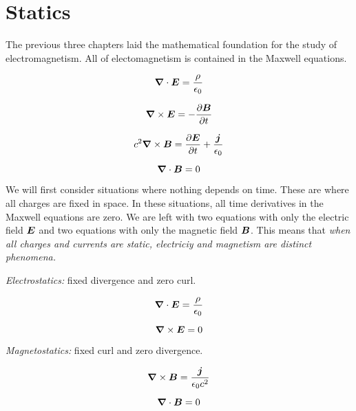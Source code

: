 \section{Statics}

The previous three chapters laid the mathematical foundation
for the study of electromagnetism.
All of electomagnetism is contained in the Maxwell equations.

\begin{equation}
  \boldsymbol{\nabla} \cdot \boldsymbol{E} = \frac{\rho}{\epsilon_0}
\end{equation}

\begin{equation}
  \boldsymbol{\nabla} \times \boldsymbol{E} = - \frac{\partial \boldsymbol{B}}{\partial t}
\end{equation}

\begin{equation}
  c^2 \boldsymbol{\nabla} \times \boldsymbol{B} = \frac{\partial \boldsymbol{E}}{\partial t} + \frac{\boldsymbol{j}}{\epsilon_0}
\end{equation}

\begin{equation}
  \boldsymbol{\nabla} \cdot \boldsymbol{B} = 0
\end{equation}

\vspace{2em}
We will first consider situations where nothing depends on time.
These are where all charges are fixed in space.
In these situations, all time derivatives in the Maxwell equations are zero.
We are left with two equations with only the electric field $\boldsymbol{E}$
and two equations with only the magnetic field $\boldsymbol{B}$.
This means that \emph{when all charges and currents are static,
electriciy and magnetism are distinct phenomena.}

\emph{Electrostatics:} fixed divergence and zero curl.

\begin{equation}
  \boldsymbol{\nabla} \cdot \boldsymbol{E} = \frac{\rho}{\epsilon_0}
\end{equation}

\begin{equation}
  \boldsymbol{\nabla} \times \boldsymbol{E} = 0
\end{equation}

\emph{Magnetostatics:} fixed curl and zero divergence.

\begin{equation}
  \boldsymbol{\nabla} \times \boldsymbol{B} = \frac{\boldsymbol{j}}{\epsilon_0 c^2}
\end{equation}

\begin{equation}
  \boldsymbol{\nabla} \cdot \boldsymbol{B} = 0
\end{equation}

